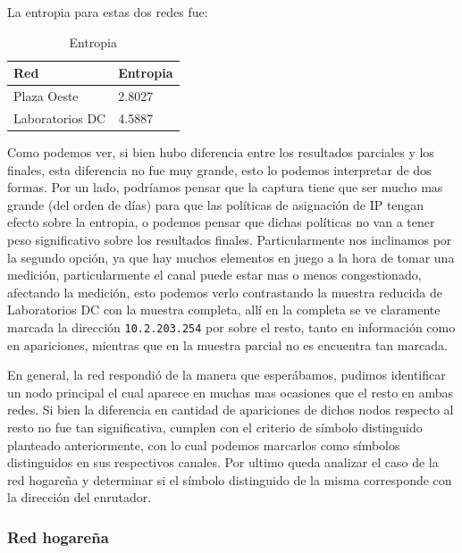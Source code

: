 
La entropia para estas dos redes fue:

\begin{table}[H]
\centering
\caption{Entropia}
\label{my-label}
\begin{tabular}{ll}
\hline
Red         & Entropia \\ \hline
Plaza Oeste & 2.8027   \\
Laboratorios DC    & 4.5887   \\ \hline
\end{tabular}
\end{table}

Como podemos ver, si bien hubo diferencia entre los resultados parciales y los finales, esta diferencia no fue muy grande, esto lo podemos interpretar de dos formas. Por un lado, podríamos pensar que la captura tiene que ser mucho mas grande (del orden de días) para que las políticas de asignación de IP tengan efecto sobre la entropia, o podemos pensar que dichas políticas no van a tener peso significativo sobre los resultados finales. Particularmente nos inclinamos por la segundo opción, ya que hay muchos elementos en juego a la hora de tomar una medición, particularmente el canal puede estar mas o menos congestionado, afectando la medición, esto podemos verlo contrastando la muestra reducida de Laboratorios DC con la muestra completa, allí en la completa se ve claramente marcada la dirección \texttt{10.2.203.254} por sobre el resto, tanto en información como en apariciones, mientras que en la muestra parcial no es encuentra tan marcada.

En general, la red respondió de la manera que esperábamos, pudimos identificar un nodo principal el cual aparece en muchas mas ocasiones que el resto en ambas redes. Si bien la diferencia en cantidad de apariciones de dichos nodos respecto al resto no fue tan significativa, cumplen con el criterio de símbolo distinguido planteado anteriormente, con lo cual podemos marcarlos como símbolos distinguidos en sus respectivos canales. Por ultimo queda analizar el caso de la red hogareña y determinar si el símbolo distinguido de la misma corresponde con la dirección del enrutador.

\subsubsection{Red hogareña}

